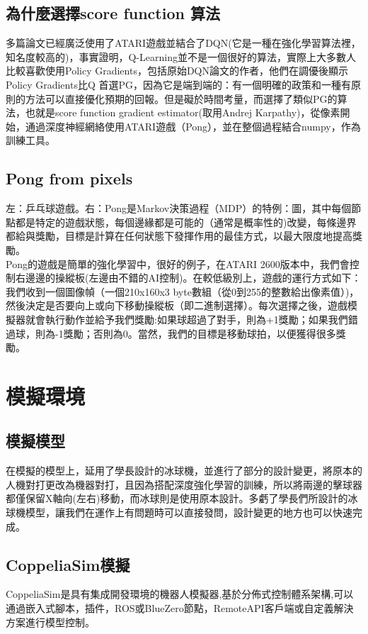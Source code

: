 \documentclass[14pt,a4paper]{report}  %
\begin{document}
\section{為什麼選擇score function 算法}
 多篇論文已經廣泛使用了ATARI遊戲並結合了DQN(它是一種在強化學習算法裡，知名度較高的)，事實證明，Q-Learning並不是一個很好的算法，實際上大多數人比較喜歡使用Policy Gradients，包括原始DQN論文的作者，他們在調優後顯示Policy Gradients比Q 首選PG，因為它是端到端的：有一個明確的政策和一種有原則的方法可以直接優化預期的回報。但是礙於時間考量，而選擇了類似PG的算法，也就是score function gradient estimator(取用Andrej Karpathy)，從像素開始，通過深度神經網絡使用ATARI遊戲（Pong），並在整個過程結合numpy，作為訓練工具。


\section{Pong from pixels}
 左：乒乓球遊戲。右：Pong是Markov決策過程（MDP）的特例：圖，其中每個節點都是特定的遊戲狀態，每個邊緣都是可能的（通常是概率性的)改變，每條邊界都給與獎勵，目標是計算在任何狀態下發揮作用的最佳方式，以最大限度地提高獎勵。\\ 
Pong的遊戲是簡單的強化學習中，很好的例子，在ATARI 2600版本中，我們會控制右邊邊的操縱板(左邊由不錯的AI控制)。在較低級別上，遊戲的運行方式如下：我們收到一個圖像幀（一個210x160x3 byte數組（從0到255的整數給出像素值）)，然後決定是否要向上或向下移動操縱板（即二進制選擇）。每次選擇之後，遊戲模擬器就會執行動作並給予我們獎勵:如果球超過了對手，則為+1獎勵；如果我們錯過球，則為-1獎勵；否則為0。當然，我們的目標是移動球拍，以便獲得很多獎勵。\\

\newpage
\chapter{模擬環境}
\section{模擬模型}
 在模擬的模型上，延用了學長設計的冰球機，並進行了部分的設計變更，將原本的人機對打更改為機器對打，且因為搭配深度強化學習的訓練，所以將兩邊的擊球器都僅保留X軸向(左右)移動，而冰球則是使用原本設計。多虧了學長們所設計的冰球機模型，讓我們在運作上有問題時可以直接發問，設計變更的地方也可以快速完成。\\
\section{CoppeliaSim模擬}
 CoppeliaSim是具有集成開發環境的機器人模擬器,基於分佈式控制體系架構,可以通過嵌入式腳本，插件，ROS或BlueZero節點，RemoteAPI客戶端或自定義解決方案進行模型控制。\\
\end{document}
